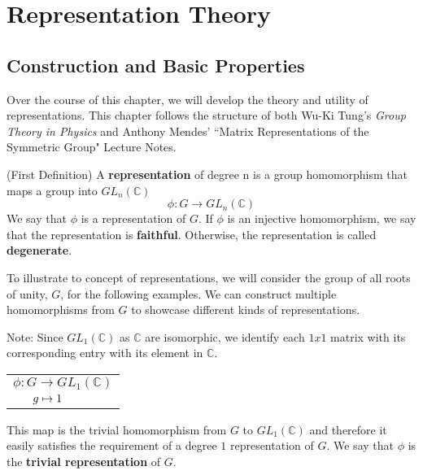 \chapter{Representation Theory}\label{rep}

\section{Construction and Basic Properties}

Over the course of this chapter, we will develop the theory and utility of representations. This chapter follows the structure of both Wu-Ki Tung's \textit{Group Theory in Physics} and Anthony Mendes' ``Matrix Representations of the Symmetric Group" Lecture Notes. \cite{Tung,Mendes}

\begin{definition}
	(First Definition) A \textbf{representation} of degree n is a group homomorphism that maps a group into $GL_n(\mathbb{C})$
	$$\phi:G\rightarrow GL_n(\mathbb{C})$$
	We say that $\phi$ is a representation of $G$. If $\phi$ is an injective homomorphism, we say that the representation is \textbf{faithful}. Otherwise, the representation is called \textbf{degenerate}.
\end{definition}

To illustrate to concept of representations, we will consider the group of all roots of unity, $G$, for the following examples. We can construct multiple homomorphisms from $G$ to showcase different kinds of representations. 

\noindent Note: Since $GL_1(\mathbb{C})$ as $\mathbb{C}$ are isomorphic, we identify each $1x1$ matrix with its corresponding entry with its element in $\mathbb{C}$.

\begin{example}\end{example}\renewcommand{\arraystretch}{0.7}\begin{center}
			\begin{tabular}{l}$\phi:G\rightarrow GL_1(\mathbb{C})$\\
			$\hspace{6mm}g\mapsto 1$
			\end{tabular}
		\end{center}


	

\noindent This map is the trivial homomorphism from $G$ to $GL_1(\mathbb{C})$ and therefore it easily satisfies the requirement of a degree $1$ representation of $G$. We say that $\phi$ is the \textbf{trivial representation} of $G$.

